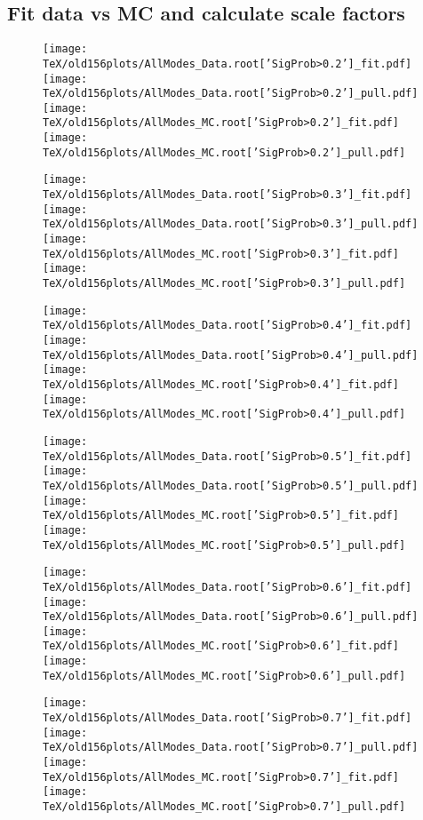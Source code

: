 \documentclass{article}
\begin{document}
\subsection{Fit data vs MC and calculate scale factors}
\begin{figure}[h!]
\begin{center}
\texttt{[image: TeX/old156plots/AllModes\_Data.root['SigProb>0.2']\_fit.pdf]}
\texttt{[image: TeX/old156plots/AllModes\_Data.root['SigProb>0.2']\_pull.pdf]}
\texttt{[image: TeX/old156plots/AllModes\_MC.root['SigProb>0.2']\_fit.pdf]}
\texttt{[image: TeX/old156plots/AllModes\_MC.root['SigProb>0.2']\_pull.pdf]}

\texttt{[image: TeX/old156plots/AllModes\_Data.root['SigProb>0.3']\_fit.pdf]}
\texttt{[image: TeX/old156plots/AllModes\_Data.root['SigProb>0.3']\_pull.pdf]}
\texttt{[image: TeX/old156plots/AllModes\_MC.root['SigProb>0.3']\_fit.pdf]}
\texttt{[image: TeX/old156plots/AllModes\_MC.root['SigProb>0.3']\_pull.pdf]}

\texttt{[image: TeX/old156plots/AllModes\_Data.root['SigProb>0.4']\_fit.pdf]}
\texttt{[image: TeX/old156plots/AllModes\_Data.root['SigProb>0.4']\_pull.pdf]}
\texttt{[image: TeX/old156plots/AllModes\_MC.root['SigProb>0.4']\_fit.pdf]}
\texttt{[image: TeX/old156plots/AllModes\_MC.root['SigProb>0.4']\_pull.pdf]}

\texttt{[image: TeX/old156plots/AllModes\_Data.root['SigProb>0.5']\_fit.pdf]}
\texttt{[image: TeX/old156plots/AllModes\_Data.root['SigProb>0.5']\_pull.pdf]}
\texttt{[image: TeX/old156plots/AllModes\_MC.root['SigProb>0.5']\_fit.pdf]}
\texttt{[image: TeX/old156plots/AllModes\_MC.root['SigProb>0.5']\_pull.pdf]}

\texttt{[image: TeX/old156plots/AllModes\_Data.root['SigProb>0.6']\_fit.pdf]}
\texttt{[image: TeX/old156plots/AllModes\_Data.root['SigProb>0.6']\_pull.pdf]}
\texttt{[image: TeX/old156plots/AllModes\_MC.root['SigProb>0.6']\_fit.pdf]}
\texttt{[image: TeX/old156plots/AllModes\_MC.root['SigProb>0.6']\_pull.pdf]}

\texttt{[image: TeX/old156plots/AllModes\_Data.root['SigProb>0.7']\_fit.pdf]}
\texttt{[image: TeX/old156plots/AllModes\_Data.root['SigProb>0.7']\_pull.pdf]}
\texttt{[image: TeX/old156plots/AllModes\_MC.root['SigProb>0.7']\_fit.pdf]}
\texttt{[image: TeX/old156plots/AllModes\_MC.root['SigProb>0.7']\_pull.pdf]}


\end{center}
\end{figure}
\end{document}
